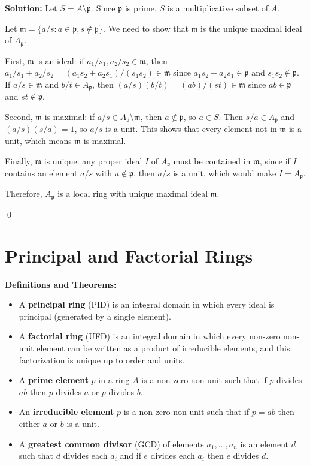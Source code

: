 \noindent\textbf{Solution:}
Let $S = A \setminus \mathfrak{p}$. Since $\mathfrak{p}$ is prime, $S$ is a multiplicative subset of $A$.

Let $\mathfrak{m} = \{a/s : a \in \mathfrak{p}, s \notin \mathfrak{p}\}$. We need to show that $\mathfrak{m}$ is the unique maximal ideal of $A_{\mathfrak{p}}$.

First, $\mathfrak{m}$ is an ideal: if $a_1/s_1, a_2/s_2 \in \mathfrak{m}$, then $a_1/s_1 + a_2/s_2 = (a_1s_2 + a_2s_1)/(s_1s_2) \in \mathfrak{m}$ since $a_1s_2 + a_2s_1 \in \mathfrak{p}$ and $s_1s_2 \notin \mathfrak{p}$. If $a/s \in \mathfrak{m}$ and $b/t \in A_{\mathfrak{p}}$, then $(a/s)(b/t) = (ab)/(st) \in \mathfrak{m}$ since $ab \in \mathfrak{p}$ and $st \notin \mathfrak{p}$.

Second, $\mathfrak{m}$ is maximal: if $a/s \in A_{\mathfrak{p}} \setminus \mathfrak{m}$, then $a \notin \mathfrak{p}$, so $a \in S$. Then $s/a \in A_{\mathfrak{p}}$ and $(a/s)(s/a) = 1$, so $a/s$ is a unit. This shows that every element not in $\mathfrak{m}$ is a unit, which means $\mathfrak{m}$ is maximal.

Finally, $\mathfrak{m}$ is unique: any proper ideal $I$ of $A_{\mathfrak{p}}$ must be contained in $\mathfrak{m}$, since if $I$ contains an element $a/s$ with $a \notin \mathfrak{p}$, then $a/s$ is a unit, which would make $I = A_{\mathfrak{p}}$.

Therefore, $A_{\mathfrak{p}}$ is a local ring with unique maximal ideal $\mathfrak{m}$.


\qed
\section{Principal and Factorial Rings}

\noindent\textbf{Definitions and Theorems:}
\begin{itemize}
\item A \textbf{principal ring} (PID) is an integral domain in which every ideal is principal (generated by a single element).
\item A \textbf{factorial ring} (UFD) is an integral domain in which every non-zero non-unit element can be written as a product of irreducible elements, and this factorization is unique up to order and units.
\item A \textbf{prime element} $p$ in a ring $A$ is a non-zero non-unit such that if $p$ divides $ab$ then $p$ divides $a$ or $p$ divides $b$.
\item An \textbf{irreducible element} $p$ is a non-zero non-unit such that if $p = ab$ then either $a$ or $b$ is a unit.
\item A \textbf{greatest common divisor} (GCD) of elements $a_1, \ldots, a_n$ is an element $d$ such that $d$ divides each $a_i$ and if $e$ divides each $a_i$ then $e$ divides $d$.
\end{itemize}


